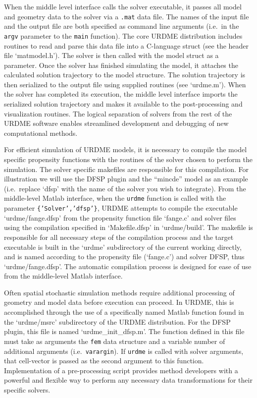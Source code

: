 When the middle level interface calls the solver executable, it passes
all model and geometry data to the solver via a \texttt{.mat} data
file. The names of the input file and the output file are both
specified as command line arguments (i.e.~in the \texttt{argv}
parameter to the \texttt{main} function). The core URDME distribution
includes routines to read and parse this data file into a C-language
struct (see the header file `matmodel.h').  The solver is then called
with the model struct as a parameter.  Once the solver has finished
simulating the model, it attaches the calculated solution trajectory
to the model structure. The solution trajectory is then serialized to
the output file using supplied routines (see `urdme.m').  When the
solver has completed its execution, the middle level interface imports
the serialized solution trajectory and makes it
available to the post-processing and visualization routines. The
logical separation of solvers from the rest of the URDME software
enables streamlined development and debugging of new computational
methods.

For efficient simulation of URDME models, it is necessary to compile
the model specific propensity functions with the routines of the
solver chosen to perform the simulation.  The solver specific
makefiles are responsible for this compilation.  For illustration we
will use the DFSP plugin and the ``mincde'' model as an example
(i.e.~replace `dfsp' with the name of the solver you wish to
integrate). From the middle-level Matlab interface, when the
\texttt{urdme} function is called with the parameter
\texttt{\{'Solver','dfsp'\}}, URDME attempts to compile the executable
`urdme/fange.dfsp' from the propensity function file `fange.c' and
solver files using the compilation specified in `Makefile.dfsp' in
`urdme/build'. The makefile is responsible for all necessary steps of
the compilation process and the target executable is built in the
`urdme' subdirectory of the current working directly, and is named
according to the propensity file (`fange.c') and solver DFSP, thus
`urdme/fange.dfsp'. The automatic compilation process is designed
for ease of use from the middle-level Matlab interface.

Often spatial stochastic simulation methods require additional
processing of geometry and model data before execution can proceed.
In URDME, this is accomplished through the use of a specifically named
Matlab function found in the `urdme/msrc' subdirectory of the URDME
distribution.  For the DFSP plugin, this file is named
`urdme\_init\_dfsp.m'. The function defined in this file must take as
arguments the \texttt{fem} data structure and a variable number of
additional arguments (i.e.~\texttt{varargin}). If \texttt{urdme} is
called with solver arguments, that cell-vector is passed as the second
argument to this function. Implementation of a pre-processing script
provides method developers with a powerful and flexible way to perform
any necessary data transformations for their specific solvers.
